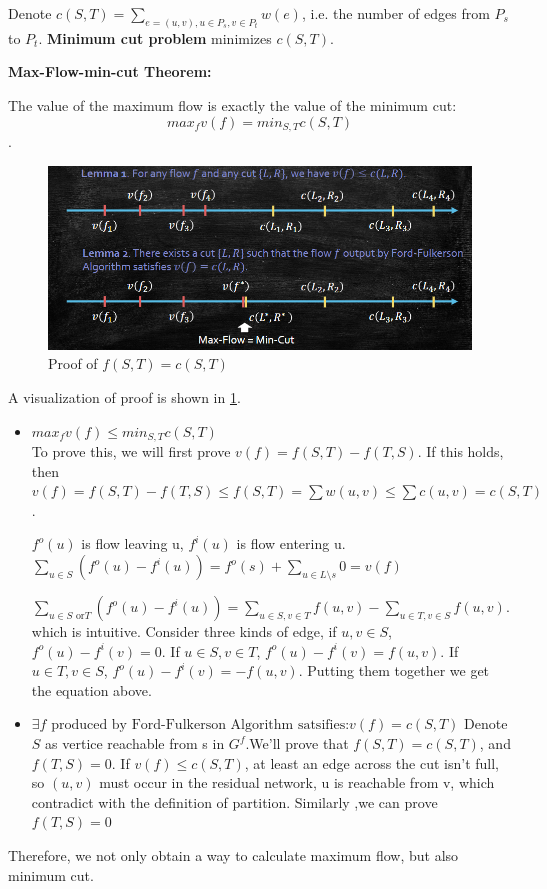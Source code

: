 Denote $c(S,T)=\sum_{e=(u,v),u\in P_s,v \in P_t} w(e)$, i.e. the number of edges from $P_s$ to $P_t$.
\textbf{Minimum cut problem} minimizes $c(S,T)$.\\
\begin{thm}
    \textbf{Max-Flow-min-cut Theorem:} 
    
    The value of the maximum flow is exactly the value of the minimum cut:
\[max_fv(f)=min_{S,T}c(S,T)\].
\end{thm}
\begin{figure}[htbp]
    \centering
    \includegraphics[width=0.7\linewidth]{Notes/fig/maxFlowProof.png}
    \caption{Proof of $f(S,T)=c(S,T)$}
    \label{fig:6-2}
\end{figure}
A visualization of proof is shown in \ref{fig:6-2}.
\begin{itemize}
    \item $max_fv(f)\leq min_{S,T}c(S,T)$\\
    To prove this, we will first prove $v(f)=f(S,T)-f(T,S)$. If this holds, then $v(f)=f(S,T)-f(T,S)\leq f(S,T)=\sum w(u,v)\leq \sum c(u,v)=c(S,T)$.

    $f^o(u)$ is flow leaving u, $f^i(u)$ is flow entering u.
    $\sum_{u\in S}(f^o(u)-f^i(u))=f^o(s)+\sum_{u\in L\setminus s}0=v(f)$

    $\sum_{u\in S\text{ or} T}(f^o(u)-f^i(u))=\sum_{u\in S,v\in T}f(u,v)-\sum_{u\in T,v\in S}f(u,v)$. which is intuitive. Consider three kinds of edge, if $u,v \in S$, $f^o(u)-f^i(v)=0$. If $u\in S, v\in T$, $f^o(u)-f^i(v)=f(u,v)$. If $u\in T, v\in S$, $f^o(u)-f^i(v)=-f(u,v)$. Putting them together we get the equation above.

    \item $\exists f \text{ produced by Ford-Fulkerson Algorithm satsifies:} v(f)= c(S,T)$
    Denote $S$ as vertice reachable from s in $G^f$.We'll prove that $f(S,T)=c(S,T)$, and $f(T,S)=0$. If $v(f)\leq c(S,T)$, at least an edge across the cut isn't full, so $(u,v)$ must occur in the residual network, u is reachable from v, which contradict with the definition of partition. Similarly ,we can prove $f(T,S)=0$

\end{itemize}
Therefore, we not only obtain a way to calculate maximum flow, but also minimum cut.
